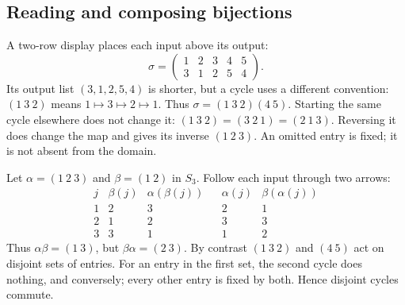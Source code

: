 \subsection{Reading and composing bijections}
A two-row display places each input above its output:
\[
\sigma=\begin{pmatrix}1&2&3&4&5\\3&1&2&5&4\end{pmatrix}.
\]
Its output list $(3,1,2,5,4)$ is shorter, but a cycle uses a different
convention: $(1\ 3\ 2)$ means $1\mapsto3\mapsto2\mapsto1$.
Thus $\sigma=(1\ 3\ 2)(4\ 5)$. Starting the same cycle elsewhere
does not change it: $(1\ 3\ 2)=(3\ 2\ 1)=(2\ 1\ 3)$.
Reversing it does change the map and gives its inverse $(1\ 2\ 3)$.
An omitted entry is fixed; it is not absent from the domain.
\begin{center}
\end{center}
\begin{example}
Let $\alpha=(1\ 2\ 3)$ and $\beta=(1\ 2)$ in $S_3$.
Follow each input through two arrows:
\[
\begin{array}{c|ccc|cc}
j&\beta(j)&\alpha(\beta(j))& &\alpha(j)&\beta(\alpha(j))\\\hline
1&2&3&&2&1\\2&1&2&&3&3\\3&3&1&&1&2
\end{array}
\]
Thus $\alpha\beta=(1\ 3)$, but $\beta\alpha=(2\ 3)$.
By contrast $(1\ 3\ 2)$ and $(4\ 5)$ act on disjoint sets of entries.
For an entry in the first set, the second cycle does nothing, and conversely;
every other entry is fixed by both. Hence disjoint cycles commute.
\end{example}
